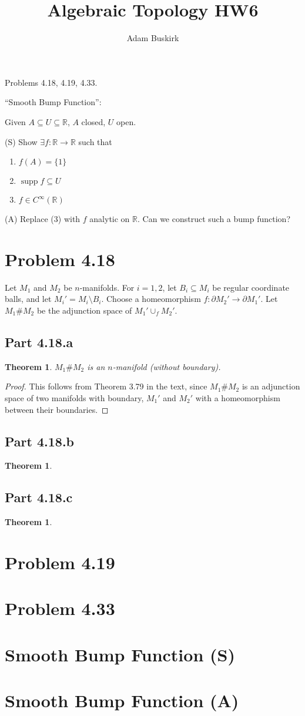 \documentclass{article}
\title{Algebraic Topology HW6}
\author{Adam Buskirk}
\newtheorem{theorem}[subsection]{Theorem}
\theoremstyle{definition}
\newcommand{\R}{\mathbb{R}}
\begin{document}
\maketitle

Problems 4.18, 4.19, 4.33.

``Smooth Bump Function'':

Given $A \subseteq U \subseteq \R$, $A$ closed, $U$ open.

(S) Show $\exists f : \R \to \R$ such that 
\begin{enumerate}
\item $f(A)=\{1\}$
\item $\operatorname{supp} f \subseteq U$
\item $f \in C^\infty (\R)$
\end{enumerate}

(A) Replace (3) with $f$ analytic on $\R$. Can we construct 
such a bump function?

\section{Problem 4.18}
Let $M_1$ and $M_2$ be $n$-manifolds. For $i=1,2$, let 
$B_i \subseteq M_i$ be regular coordinate balls, and let
$M_i' = M_i \setminus B_i$. Choose a homeomorphism 
$f : \partial M_2' \to \partial M_1'$. Let 
$M_1 \# M_2$ be the adjunction space of $M_1' \cup_f M_2'$.
\subsection{Part 4.18.a}
\begin{theorem}
$M_1 \# M_2$ is an $n$-manifold (without boundary).
\end{theorem}
\begin{proof}
This follows from Theorem 3.79 in the text, since $M_1 \# M_2$ is an
adjunction space of two manifolds with boundary, $M_1'$ and $M_2'$ with
a homeomorphism between their boundaries.
\end{proof}
\subsection{Part 4.18.b}
\begin{theorem}

\end{theorem}
\subsection{Part 4.18.c}
\begin{theorem}
\end{theorem}
\section{Problem 4.19}
\section{Problem 4.33}
\section{Smooth Bump Function (S)}
\section{Smooth Bump Function (A)}
\end{document}
